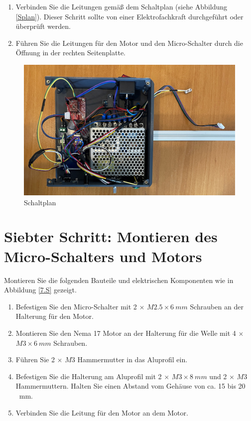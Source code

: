 \begin{enumerate}
	\item Verbinden Sie die Leitungen gemäß dem Schaltplan (siehe Abbildung \ref{Splan}). Dieser Schritt sollte von einer Elektrofachkraft durchgeführt oder überprüft werden.
	\item Führen Sie die Leitungen für den Motor und den Micro-Schalter durch die Öffnung in der rechten Seitenplatte.
\end{enumerate}

\begin{figure}[H]
	\begin{center}
		\includegraphics[width=\textwidth]{Images/6Schr.jpg}
		\caption{Schaltplan} \label{6.S}
	\end{center}
\end{figure}


\section{Siebter Schritt: Montieren des Micro-Schalters und Motors}

Montieren Sie die folgenden Bauteile und elektrischen Komponenten wie in Abbildung \ref{7.S} gezeigt.

\begin{enumerate}
	\item Befestigen Sie den Micro-Schalter mit 2 $\times$ $ M2.5 \times 6 \ mm $ Schrauben an der Halterung für den Motor.
	\item Montieren Sie den Nema 17 Motor an der Halterung für die Welle mit 4 $\times$ $ M3 \times 6 \ mm  $ Schrauben.
	\item Führen Sie 2 $\times$ $ M3 $ Hammermutter in das Aluprofil ein.
	\item Befestigen Sie die Halterung am Aluprofil mit 2 $\times$ $ M3 \times 8 \ mm $ und 2 $\times$ $ M3 $ Hammermuttern. Halten Sie einen Abstand vom Gehäuse von ca. 15 bis 20 \ mm. 
	\item Verbinden Sie die Leitung für den Motor an dem Motor. 
\end{enumerate}

